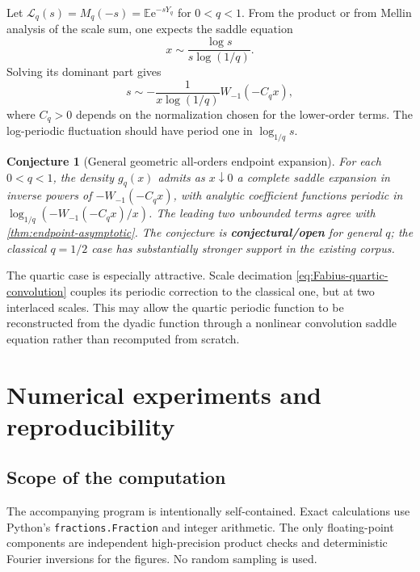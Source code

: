 \documentclass[11pt,oneside]{article}
\numberwithin{equation}{section}
\newtheorem{conjecture}[theorem]{Conjecture}
\theoremstyle{definition}
\theoremstyle{remark}
\newcommand{\E}{\mathbb E}
\newcommand{\e}{\mathrm e}
\newcommand{\openstatus}{\textcolor{deepred}{\textbf{conjectural/open}}}
\begin{document}
Let $\mathcal L_q(s)=M_q(-s)=\E\e^{-sY_q}$ for $0<q<1$.  From the product
or from Mellin analysis of the scale sum, one expects the saddle equation
\begin{equation}
 x\sim\frac{\log s}{s\log(1/q)}.
 \label{eq:saddle-equation}
\end{equation}
Solving its dominant part gives
\begin{equation}
 s\sim-\frac1{x\log(1/q)}
 W_{-1}(-C_qx),
 \label{eq:Lambert-saddle}
\end{equation}
where $C_q>0$ depends on the normalization chosen for the lower-order terms.
The log-periodic fluctuation should have period one in
$\log_{1/q}s$.

\begin{conjecture}[General geometric all-orders endpoint expansion]
\label{conj:all-orders-q}
For each $0<q<1$, the density $g_q(x)$ admits as $x\downarrow0$ a complete
saddle expansion in inverse powers of
$-W_{-1}(-C_qx)$, with analytic coefficient functions periodic in
$\log_{1/q}(-W_{-1}(-C_qx)/x)$.  The leading two unbounded terms agree with
\cref{thm:endpoint-asymptotic}.  The conjecture is \openstatus{} for general
$q$; the classical $q=1/2$ case has substantially stronger support in the
existing corpus.
\end{conjecture}

The quartic case is especially attractive.  Scale decimation
\eqref{eq:Fabius-quartic-convolution} couples its periodic correction to the
classical one, but at two interlaced scales.  This may allow the quartic
periodic function to be reconstructed from the dyadic function through a
nonlinear convolution saddle equation rather than recomputed from scratch.

\section{Numerical experiments and reproducibility}
\label{sec:numerics}

\subsection{Scope of the computation}

The accompanying program  is intentionally
self-contained.  Exact calculations use Python's \texttt{fractions.Fraction}
and integer arithmetic.  The only floating-point components are independent
high-precision product checks and deterministic Fourier inversions for the
figures.  No random sampling is used.
\end{document}
